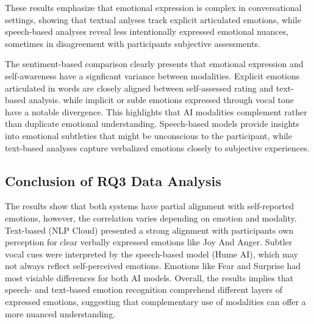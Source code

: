 These results emphasize that emotional expression is complex in conversational settings, showing that textual anlyses track explicit articulated emotions, 
while speech-based analyses reveal less intentionally expressed emotional nuances, sometimes in disagreement with participants subjective assessments. 

The sentiment-based comparison clearly presents that emotional expression and self-awareness have a signficant variance between modalities. Explicit emotions articulated in words are closely aligned between self-assessed rating and text-based analysis. 
while implicit or suble emotions expressed through vocal tone have a notable divergence. This highlights that AI modalities complement rather than duplicate emotional understanding. 
Speech-based models provide insights into emotional subtleties that might be unconscious to the participant, while text-based analyses capture verbalized emotions closely to subjective experiences. 


\subsection{Conclusion of RQ3 Data Analysis}
The results show that both systems have partial alignment with self-reported emotions, however, the correlation varies depending on emotion and modality. 
Text-based (NLP Cloud) presented a strong alignment with participants own perception for clear verbally expressed emotions like Joy And Anger. Subtler vocal cues were interpreted by the speech-based 
model (Hume AI), which may not always reflect self-perceived emotions. Emotions like Fear and Surprise had most visiable differences for both AI models. 
Overall, the results implies that speech- and text-based emotion recognition comprehend different layers of expressed emotions, suggesting that complementary use of modalities can offer a more nuanced understanding.  